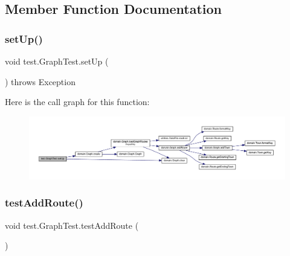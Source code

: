 \subsection{Member Function Documentation}
\mbox{\label{classtest_1_1_graph_test_a2e6d2327f0ae6fc3f3d5de35eebe31dd}} 
\subsubsection{\texorpdfstring{set\+Up()}{setUp()}}
{\footnotesize\ttfamily void test.\+Graph\+Test.\+set\+Up (\begin{DoxyParamCaption}{ }\end{DoxyParamCaption}) throws Exception}

Here is the call graph for this function\+:\nopagebreak
\begin{figure}[H]
\begin{center}
\leavevmode
\includegraphics[width=350pt]{classtest_1_1_graph_test_a2e6d2327f0ae6fc3f3d5de35eebe31dd_cgraph}
\end{center}
\end{figure}
\mbox{\label{classtest_1_1_graph_test_ab7eeb2aca803777eafaca3a6da72ab9e}} 
\subsubsection{\texorpdfstring{test\+Add\+Route()}{testAddRoute()}}
{\footnotesize\ttfamily void test.\+Graph\+Test.\+test\+Add\+Route (\begin{DoxyParamCaption}{ }\end{DoxyParamCaption})}


